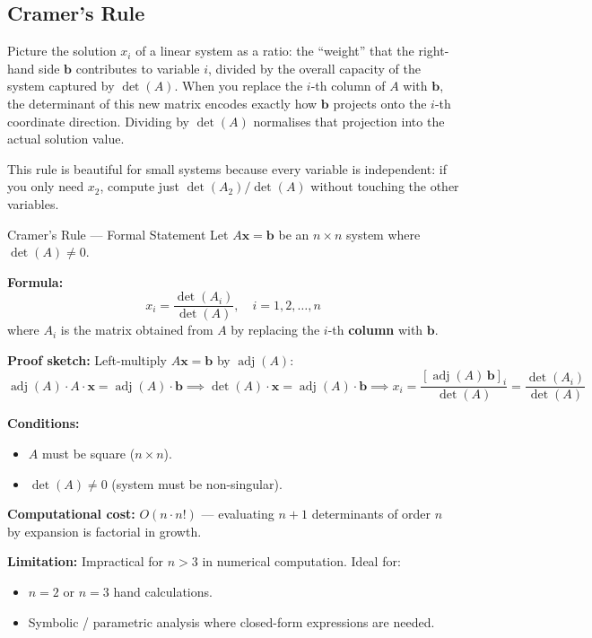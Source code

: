 \documentclass[12pt,a4paper]{article}
\begin{document}
\subsection{Cramer's Rule}

Picture the solution \(x_i\) of a linear system as a ratio: the ``weight'' that the right-hand side \(\mathbf{b}\) contributes to variable \(i\), divided by the overall capacity of the system captured by \(\det(A)\). When you replace the \(i\)-th column of \(A\) with \(\mathbf{b}\), the determinant of this new matrix encodes exactly how \(\mathbf{b}\) projects onto the \(i\)-th coordinate direction. Dividing by \(\det(A)\) normalises that projection into the actual solution value.

This rule is beautiful for small systems because every variable is independent: if you only need \(x_2\), compute just \(\det(A_2)/\det(A)\) without touching the other variables.

\begin{infobox}{Cramer's Rule --- Formal Statement}
Let \(A\mathbf{x} = \mathbf{b}\) be an \(n \times n\) system where \(\det(A) \neq 0\).

\textbf{Formula:}
\[
x_i = \frac{\det(A_i)}{\det(A)}, \quad i = 1, 2, \ldots, n
\]
where \(A_i\) is the matrix obtained from \(A\) by replacing the \(i\)-th \textbf{column} with \(\mathbf{b}\).

\textbf{Proof sketch:} Left-multiply \(A\mathbf{x} = \mathbf{b}\) by \(\operatorname{adj}(A)\):
\[
\operatorname{adj}(A) \cdot A \cdot \mathbf{x} = \operatorname{adj}(A) \cdot \mathbf{b}
\implies \det(A) \cdot \mathbf{x} = \operatorname{adj}(A) \cdot \mathbf{b}
\implies x_i = \frac{[\operatorname{adj}(A)\,\mathbf{b}]_i}{\det(A)} = \frac{\det(A_i)}{\det(A)}
\]

\textbf{Conditions:}
\begin{itemize}[noitemsep]
  \item \(A\) must be square (\(n \times n\)).
  \item \(\det(A) \neq 0\) (system must be non-singular).
\end{itemize}

\textbf{Computational cost:} \(O(n \cdot n!)\) --- evaluating \(n+1\) determinants of order \(n\) by expansion is factorial in growth.

\textbf{Limitation:} Impractical for \(n > 3\) in numerical computation. Ideal for:
\begin{itemize}[noitemsep]
  \item \(n = 2\) or \(n = 3\) hand calculations.
  \item Symbolic / parametric analysis where closed-form expressions are needed.
\end{itemize}
\end{infobox}
\end{document}
